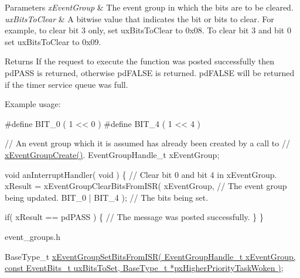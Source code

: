 \begin{DoxyParams}{Parameters}
{\em x\+Event\+Group} & The event group in which the bits are to be cleared.\\
\hline
{\em ux\+Bits\+To\+Clear} & A bitwise value that indicates the bit or bits to clear. For example, to clear bit 3 only, set ux\+Bits\+To\+Clear to 0x08. To clear bit 3 and bit 0 set ux\+Bits\+To\+Clear to 0x09.\\
\hline
\end{DoxyParams}
\begin{DoxyReturn}{Returns}
If the request to execute the function was posted successfully then pd\+P\+A\+SS is returned, otherwise pd\+F\+A\+L\+SE is returned. pd\+F\+A\+L\+SE will be returned if the timer service queue was full.
\end{DoxyReturn}
Example usage\+: 
\begin{DoxyPre}
  #define BIT\_0 ( 1 << 0 )
  #define BIT\_4 ( 1 << 4 )\end{DoxyPre}



\begin{DoxyPre}  // An event group which it is assumed has already been created by a call to
  // \hyperlink{vendor_2ceedling_2plugins_2freertos_2src_2freertos_2include_2event__groups_8h_a7ed741a0902718aca9c8d3ca273f1b73}{xEventGroupCreate()}.
  EventGroupHandle\_t xEventGroup;\end{DoxyPre}



\begin{DoxyPre}  void anInterruptHandler( void )
  \{
    // Clear bit 0 and bit 4 in xEventGroup.
    xResult = xEventGroupClearBitsFromISR(
                        xEventGroup,     // The event group being updated.
                        BIT\_0 | BIT\_4 ); // The bits being set.\end{DoxyPre}



\begin{DoxyPre}    if( xResult == pdPASS )
    \{
        // The message was posted successfully.
    \}
 \}
  \end{DoxyPre}


event\+\_\+groups.\+h 
\begin{DoxyPre}
   BaseType\_t \hyperlink{vendor_2ceedling_2plugins_2freertos_2src_2freertos_2include_2event__groups_8h_a62b68278abac6358369ae8e390988a02}{xEventGroupSetBitsFromISR( EventGroupHandle\_t xEventGroup, const EventBits\_t uxBitsToSet, BaseType\_t *pxHigherPriorityTaskWoken )};
\end{DoxyPre}


